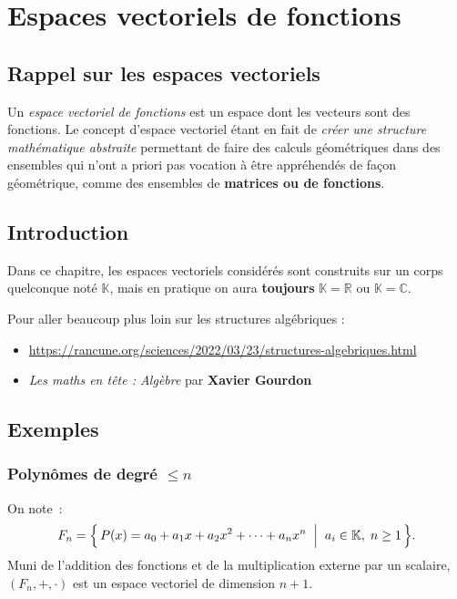 \chapter{Espaces vectoriels de fonctions} \label{chap:evf}

\section{Rappel sur les espaces vectoriels}
Un \emph{espace vectoriel de fonctions} est un espace dont les
vecteurs sont des fonctions. Le concept d'espace vectoriel étant en
fait de \emph{créer une structure mathématique abstraite} permettant de
faire des calculs géométriques dans des ensembles qui n'ont a priori
pas vocation à être appréhendés de façon géométrique, comme des
ensembles de \textbf{matrices ou de fonctions}.

\section{Introduction}
Dans ce chapitre, les espaces vectoriels considérés sont construits
sur un corps quelconque not\'e $\mathbb{K}$, mais en pratique on aura
\textbf{toujours} $\mathbb{K}=\mathbb{R}$ ou $\mathbb{K}=\mathbb{C}$.

\begin{Note}
	Pour aller beaucoup plus loin sur les structures alg\'ebriques :
	\begin{itemize}
		\item \href{Structures algébriques : THE poster}{https://rancune.org/sciences/2022/03/23/structures-algebriques.html}
		\item \emph{Les maths en tête : Algèbre} par \textbf{Xavier Gourdon}\Cite{Gourdon2009}
	\end{itemize}
\end{Note}

\section{Exemples}

\subsection{Polynômes de degré $\leq n$}
On note~:
\[
  F_n = \Bigl\{\, P(x) = a_0 + a_1 x + a_2 x^2 + \cdots + a_n x^n
  \;\Bigm|\; a_i \in \mathbb{K},\; n \geq 1 \,\Bigr\}.
\]
Muni de l’addition des fonctions et de la multiplication externe par
un scalaire,
$(F_n,+,\cdot)$ est un espace vectoriel de dimension $n+1$.


